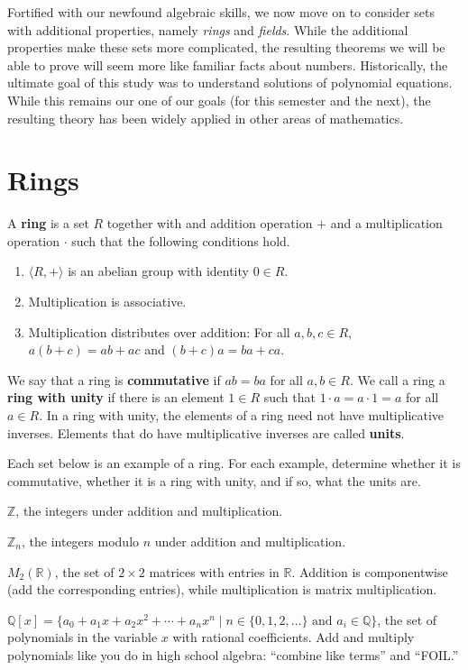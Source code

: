 Fortified with our newfound algebraic skills, we now move on to consider sets with additional properties, namely \emph{rings} and \emph{fields}. While the additional properties make these sets more complicated, the resulting theorems we will be able to prove will seem more like familiar facts about numbers. Historically, the ultimate goal of this study was to understand solutions of polynomial equations. While this remains our one of our goals (for this semester and the next), the resulting theory has been widely applied in other areas of mathematics.

\section{Rings}

\begin{definition}
A \textbf{ring} is a set \(R\) together with and addition operation \(+\) and a multiplication operation \(\cdot\) such that the following conditions hold.
\begin{enumerate}
  \item \(\langle  R, + \rangle \) is an abelian group with identity \(0 \in R\).
  \item Multiplication is associative.
  \item Multiplication distributes over addition: For all \(a,b,c\in R\), \(a(b+c)=ab+ac\) and \((b+c)a=ba+ca\).
\end{enumerate}
\end{definition}

We say that a ring is \textbf{commutative} if \(ab = ba\) for all \(a,b\in R\).
We call a ring a \textbf{ring with unity} if there is an element \(1\in R\) such that \(1\cdot a = a\cdot 1=a\) for all \(a\in R\).
In a ring with unity, the elements of a ring need not have multiplicative inverses. Elements that do have multiplicative inverses are called \textbf{units}.

\begin{problem}
Each set below is an example of a ring. For each example, determine whether it is commutative, whether it is a ring with unity, and if so, what the units are.
\begin{problemparts}
  \item \(\mathbb{Z}\), the integers under addition and multiplication.
  \item \(\mathbb{Z}_n\), the integers modulo \(n\) under addition and multiplication.
  \item \(M_2(\mathbb{R})\), the set of \(2\times 2\) matrices with entries in \(\mathbb{R}\). Addition is componentwise (add the corresponding entries), while multiplication is matrix multiplication.
  \item \(\mathbb{Q}[x]=\{a_0+a_1x+a_2x^2+\cdots+a_nx^n \mid n\in \{0,1,2,\ldots\}\mbox{ and } a_i\in \mathbb{Q}\}\), the set of polynomials in the variable \(x\) with rational coefficients. Add and multiply polynomials like you do in high school algebra: ``combine like terms'' and ``FOIL.''
\end{problemparts}
\end{problem}

